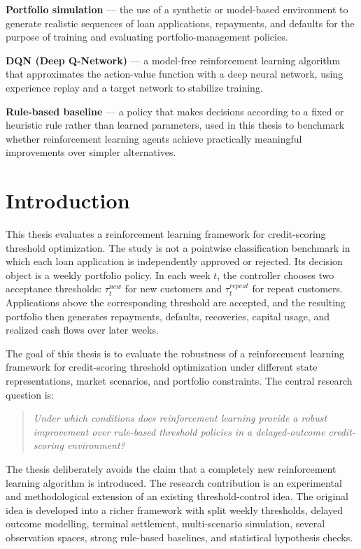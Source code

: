 \documentclass[12pt,a4paper]{article}
\begin{document}
\medskip\noindent\textbf{Portfolio simulation} --- the use of a synthetic or model-based environment to generate realistic sequences of loan applications, repayments, and defaults for the purpose of training and evaluating portfolio-management policies.

\medskip\noindent\textbf{DQN (Deep Q-Network)} --- a model-free reinforcement learning algorithm that approximates the action-value function with a deep neural network, using experience replay and a target network to stabilize training.

\medskip\noindent\textbf{Rule-based baseline} --- a policy that makes decisions according to a fixed or heuristic rule rather than learned parameters, used in this thesis to benchmark whether reinforcement learning agents achieve practically meaningful improvements over simpler alternatives.

\clearpage
\tableofcontents
\clearpage

\section{Introduction}

This thesis evaluates a reinforcement learning framework for credit-scoring threshold optimization. The study is not a pointwise classification benchmark in which each loan application is independently approved or rejected. Its decision object is a weekly portfolio policy. In each week $t$, the controller chooses two acceptance thresholds: $\tau^{new}_t$ for new customers and $\tau^{repeat}_t$ for repeat customers. Applications above the corresponding threshold are accepted, and the resulting portfolio then generates repayments, defaults, recoveries, capital usage, and realized cash flows over later weeks.

The goal of this thesis is to evaluate the robustness of a reinforcement learning framework for credit-scoring threshold optimization under different state representations, market scenarios, and portfolio constraints. The central research question is:
\begin{quote}
    \emph{Under which conditions does reinforcement learning provide a robust improvement over rule-based threshold policies in a delayed-outcome credit-scoring environment?}
\end{quote}

The thesis deliberately avoids the claim that a completely new reinforcement learning algorithm is introduced. The research contribution is an experimental and methodological extension of an existing threshold-control idea. The original idea is developed into a richer framework with split weekly thresholds, delayed outcome modelling, terminal settlement, multi-scenario simulation, several observation spaces, strong rule-based baselines, and statistical hypothesis checks.
\end{document}
